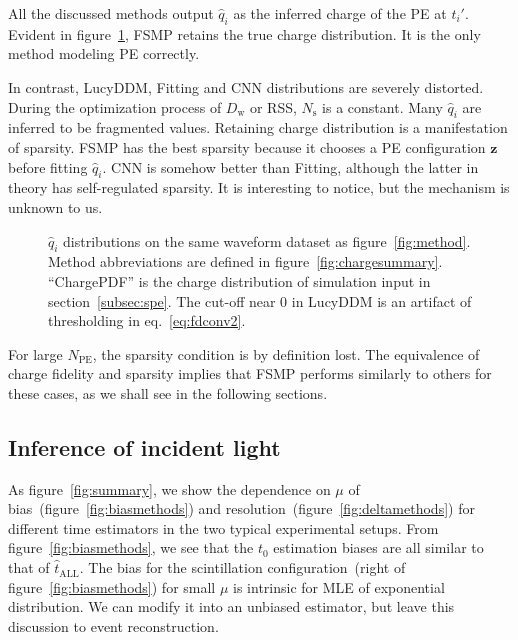 All the discussed methods output $\hat{q}_i$ as the inferred charge of the PE at $t_i'$.  Evident in figure~\ref{fig:recchargehist}, FSMP retains the true charge distribution.  It is the only method modeling PE correctly.

In contrast, LucyDDM, Fitting and CNN distributions are severely distorted.  During the optimization process of $D_\mathrm{w}$ or RSS, $N_\mathrm{s}$ is a constant. Many $\hat{q}_i$ are inferred to be fragmented values.  Retaining charge distribution is a manifestation of sparsity.  FSMP has the best sparsity because it chooses a PE configuration $\bm{z}$ before fitting $\hat{q}_i$.  CNN is somehow better than Fitting, although the latter in theory has self-regulated sparsity.  It is interesting to notice, but the mechanism is unknown to us.

\begin{figure}[H]
  \centering
  \resizebox{0.6\textwidth}{!}{}
  \caption{\label{fig:recchargehist} $\hat{q}_i$ distributions on the same waveform dataset as figure~\ref{fig:method}.  Method abbreviations are defined in figure~\ref{fig:chargesummary}. ``ChargePDF'' is the charge distribution of simulation input in section~\ref{subsec:spe}. The cut-off near 0 in LucyDDM is an artifact of thresholding in eq.~\eqref{eq:fdconv2}.}
\end{figure}

For large $N_\mathrm{PE}$, the sparsity condition is by definition lost.  The equivalence of charge fidelity and sparsity implies that FSMP performs similarly to others for these cases, as we shall see in the following sections.

\subsection{Inference of incident light}
\label{subsec:timeresolution}

As figure~\ref{fig:summary}, we show the dependence on $\mu$ of bias~(figure~\ref{fig:biasmethods}) and resolution~(figure~\ref{fig:deltamethods}) for different time estimators in the two typical experimental setups.  From figure~\ref{fig:biasmethods}, we see that the $t_0$ estimation biases are all similar to that of $\hat{t}_\mathrm{ALL}$. The bias for the scintillation configuration~(right of figure~\ref{fig:biasmethods}) for small $\mu$ is intrinsic for MLE of exponential distribution.  We can modify it into an unbiased estimator, but leave this discussion to event reconstruction.

